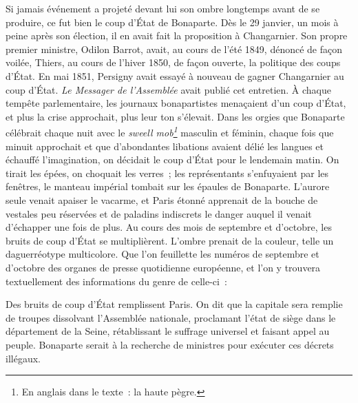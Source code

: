 \documentclass[french,twoside]{book} %
\newenvironment{quoteblock}%
  {\begin{quoting}}
  {\end{quoting}}
\newenvironment{quotebar}{%
    \def\FrameCommand{{\color{rubric!10!}\vrule width 0.5em} \hspace{0.9em}}%
    \def\OuterFrameSep{\itemsep} %
    \MakeFramed {\advance\hsize-\width \FrameRestore}
  }%
  {%
    \endMakeFramed
  }
\renewenvironment{quoteblock}%
  {%
    \savenotes
    \setstretch{0.9}
    \normalfont
    \begin{quotebar}
  }
  {%
    \end{quotebar}
    \spewnotes
  }
\begin{document}
Si jamais événement a projeté devant lui son ombre longtemps avant de se produire, ce fut bien le coup d’État de Bonaparte. Dès le 29 janvier, un mois à peine après son élection, il en avait fait la proposition à Changarnier. Son propre premier ministre, Odilon Barrot, avait, au cours de l’été 1849, dénoncé de façon voilée, Thiers, au cours de l’hiver 1850, de façon ouverte, la politique des coups d’État. En mai 1851, Persigny avait essayé à nouveau de gagner Changarnier au coup d’État. \emph{Le Messager de l’Assemblée} avait publié cet entretien. À chaque tempête parlementaire, les journaux bonapartistes menaçaient d’un coup d’État, et plus la crise approchait, plus leur ton s’élevait. Dans les orgies que Bonaparte célébrait chaque nuit avec le \emph{sweell mob\footnote{En anglais dans le texte : la haute pègre.}} masculin et féminin, chaque fois que minuit approchait et que d’abondantes libations avaient délié les langues et échauffé l’imagination, on décidait le coup d’État pour le lendemain matin. On tirait les épées, on choquait les verres ; les représentants s’enfuyaient par les fenêtres, le manteau impérial tombait sur les épaules de Bonaparte. L’aurore seule venait apaiser le vacarme, et Paris étonné apprenait de la bouche de vestales peu réservées et de paladins indiscrets le danger auquel il venait d’échapper une fois de plus. Au cours des mois de septembre et d’octobre, les bruits de coup d’État se multiplièrent. L’ombre prenait de la couleur, telle un daguerréotype multicolore. Que l’on feuillette les numéros de septembre et d’octobre des organes de presse quotidienne européenne, et l’on y trouvera textuellement des informations du genre de celle-ci :\par

\begin{quoteblock}
 \noindent Des bruits de coup d’État remplissent Paris. On dit que la capitale sera remplie de troupes dissolvant l’Assemblée nationale, proclamant l’état de siège dans le département de la Seine, rétablissant le suffrage universel et faisant appel au peuple. Bonaparte serait à la recherche de ministres pour exécuter ces décrets illégaux.
\end{quoteblock}
\end{document}
